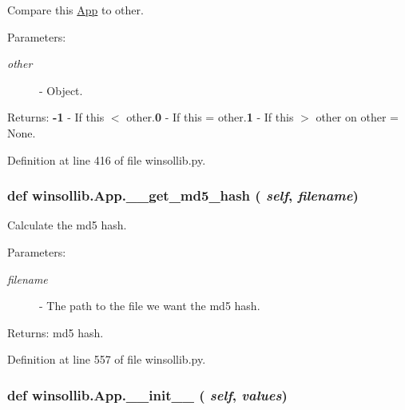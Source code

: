 Compare this \hyperlink{classwinsollib_1_1App}{App} to other. 

\begin{Desc}
\item[Parameters:]
\begin{description}
\item[{\em other}]- Object. \end{description}
\end{Desc}
\begin{Desc}
\item[Returns:]{\bf -1} - If this $<$ other.{\bf 0} - If this = other.{\bf 1} - If this $>$ other on other = None. \end{Desc}


Definition at line 416 of file winsollib.py.\hypertarget{classwinsollib_1_1App_ec84db2c67a7f820bb57cda445d417b2}{
\subsubsection[\_\-\_\-get\_\-md5\_\-hash]{\setlength{\rightskip}{0pt plus 5cm}def winsollib.App.\_\-\_\-get\_\-md5\_\-hash ( {\em self},  {\em filename})}}
\label{classwinsollib_1_1App_ec84db2c67a7f820bb57cda445d417b2}


Calculate the md5 hash. 

\begin{Desc}
\item[Parameters:]
\begin{description}
\item[{\em filename}]- The path to the file we want the md5 hash. \end{description}
\end{Desc}
\begin{Desc}
\item[Returns:]md5 hash. \end{Desc}


Definition at line 557 of file winsollib.py.\hypertarget{classwinsollib_1_1App_edd0227fef6f6212583896750e1986ef}{
\subsubsection[\_\-\_\-init\_\-\_\-]{\setlength{\rightskip}{0pt plus 5cm}def winsollib.App.\_\-\_\-init\_\-\_\- ( {\em self},  {\em values})}}
\label{classwinsollib_1_1App_edd0227fef6f6212583896750e1986ef}


